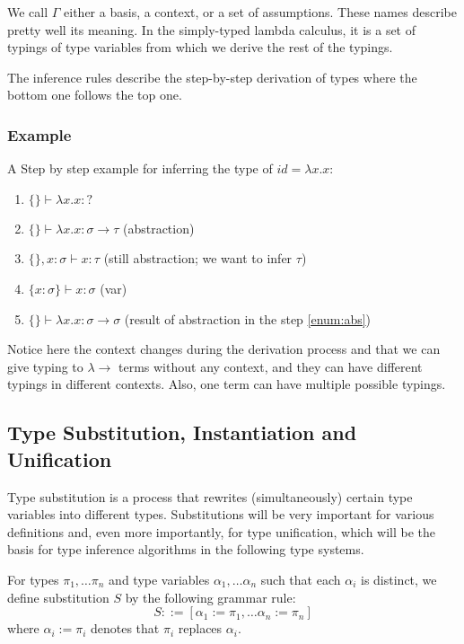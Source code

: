 We call $\Gamma$ either a basis, a context, or a set of assumptions. These names describe pretty well its meaning. In the simply-typed lambda calculus, it is a set of typings of type variables from which we derive the rest of the typings.

The inference rules describe the step-by-step derivation of types where the bottom one follows the top one.

\subsubsection{Example}
\label{sssec:idExample}
A Step by step example for inferring the type of $id = \lambda x . x$:

\begin{enumerate}
    \item $\{\} \vdash \lambda x . x : ?$
    \item $\{\} \vdash \lambda x . x : \sigma \rightarrow \tau$ (abstraction) \label{enum:abs}
    \item $\{\}, x : \sigma \vdash x : \tau$ (still abstraction; we want to infer $\tau$)
    \item $\{x : \sigma\} \vdash x : \sigma$ (var)
    \item $\{\} \vdash \lambda x . x : \sigma \rightarrow \sigma$ (result of abstraction in the step \ref{enum:abs})
\end{enumerate}

Notice here the context changes during the derivation process and that we can give typing to $\lambda\rightarrow$ terms without any context, and they can have different typings in different contexts. Also, one term can have multiple possible typings.


\subsection{Type Substitution, Instantiation and Unification}

\begin{defn}
    \label{defn:substitution}
    Type substitution is a process that rewrites (simultaneously) certain type variables into different types. Substitutions will be very important for various definitions and, even more importantly, for type unification, which will be the basis for type inference algorithms in the following type systems.

    For types $\pi_1, \dots \pi_n$ and type variables $\alpha_1, \dots \alpha_n$ such that each $\alpha_i$ is distinct, we define substitution $S$ by the following grammar rule:
    $$S ::= [\alpha_1 := \pi_1, \dots \alpha_n := \pi_n]$$
    where $\alpha_i := \pi_i$ denotes that $\pi_i$ replaces $\alpha_i$.
\end{defn}

